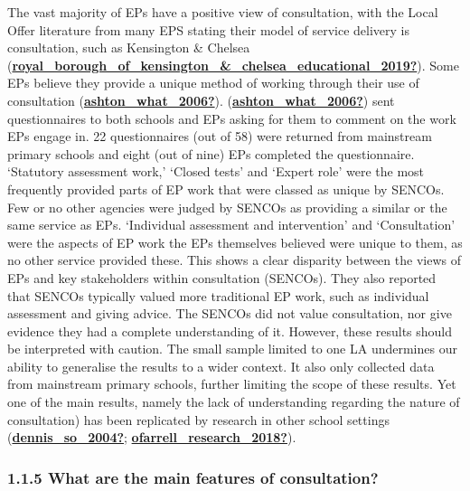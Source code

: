 \documentclass[
]{article}
\begin{document}
The vast majority of EPs have a positive view of consultation, with the
Local Offer literature from many EPS stating their model of service
delivery is consultation, such as Kensington \& Chelsea
(\protect\hyperlink{ref-royal_borough_of_kensington_ux5cux26_chelsea_educational_2019}{\textbf{royal\_borough\_of\_kensington\_\&\_chelsea\_educational\_2019?}}).
Some EPs believe they provide a unique method of working through their
use of consultation
(\protect\hyperlink{ref-ashton_what_2006}{\textbf{ashton\_what\_2006?}}).
(\protect\hyperlink{ref-ashton_what_2006}{\textbf{ashton\_what\_2006?}})
sent questionnaires to both schools and EPs asking for them to comment
on the work EPs engage in. 22 questionnaires (out of 58) were returned
from mainstream primary schools and eight (out of nine) EPs completed
the questionnaire. `Statutory assessment work,' `Closed tests' and
`Expert role' were the most frequently provided parts of EP work that
were classed as unique by SENCOs. Few or no other agencies were judged
by SENCOs as providing a similar or the same service as EPs. `Individual
assessment and intervention' and `Consultation' were the aspects of EP
work the EPs themselves believed were unique to them, as no other
service provided these. This shows a clear disparity between the views
of EPs and key stakeholders within consultation (SENCOs). They also
reported that SENCOs typically valued more traditional EP work, such as
individual assessment and giving advice. The SENCOs did not value
consultation, nor give evidence they had a complete understanding of it.
However, these results should be interpreted with caution. The small
sample limited to one LA undermines our ability to generalise the
results to a wider context. It also only collected data from mainstream
primary schools, further limiting the scope of these results. Yet one of
the main results, namely the lack of understanding regarding the nature
of consultation) has been replicated by research in other school
settings
(\protect\hyperlink{ref-dennis_so_2004}{\textbf{dennis\_so\_2004?}};
\protect\hyperlink{ref-ofarrell_research_2018}{\textbf{ofarrell\_research\_2018?}}).

\hypertarget{what-are-the-main-features-of-consultation}{%
\subsubsection{1.1.5 What are the main features of
consultation?}\label{what-are-the-main-features-of-consultation}}
\end{document}
